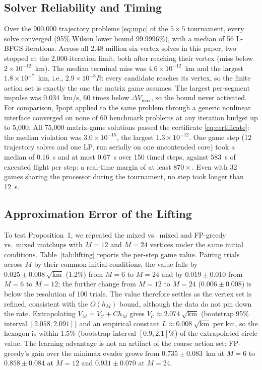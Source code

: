 \documentclass[letterpaper, 10 pt, conference]{ieeeconf}  %
\begin{document}
\subsection{Solver Reliability and Timing}

Over the 900,000 trajectory problems \eqref{eq:mpc} of the $5 \times 5$ tournament, every solve converged (95\% Wilson lower bound 99.9996\%), with a median of 56 L-BFGS iterations. Across all 2.48 million six-vertex solves in this paper, two stopped at the 2,000-iteration limit, both after reaching their vertex (miss below $2 \times 10^{-12}$~km). The median terminal miss was $4.6 \times 10^{-12}$~km and the largest $1.8 \times 10^{-7}$~km, i.e., $2.9 \times 10^{-8} R$: every candidate reaches its vertex, so the finite action set is exactly the one the matrix game assumes. The largest per-segment impulse was 0.034~km/s, 60 times below $\Delta V_{\max}$, so the bound never activated. For comparison, Ipopt applied to the same problem through a generic nonlinear interface converged on none of 60 benchmark problems at any iteration budget up to 5,000. All 75,000 matrix-game solutions passed the certificate \eqref{eq:certificate}: the median violation was $3.0 \times 10^{-15}$, the largest $1.3 \times 10^{-12}$. One game step (12 trajectory solves and one LP, run serially on one uncontended core) took a median of 0.16~s and at most 0.67~s over 150 timed steps, against 583~s of executed flight per step: a real-time margin of at least $870\times$. Even with 32 games sharing the processor during the tournament, no step took longer than 12~s.

\subsection{Approximation Error of the Lifting}

To test Proposition~1, we repeated the mixed vs.\ mixed and FP-greedy vs.\ mixed matchups with $M = 12$ and $M = 24$ vertices under the same initial conditions. Table~\ref{tab:lifting} reports the per-step game value. Pairing trials across $M$ by their common initial conditions, the value falls by $0.025 \pm 0.008\ \sqrt{\mathrm{km}}$ (1.2\%) from $M = 6$ to $M = 24$ and by $0.019 \pm 0.010$ from $M = 6$ to $M = 12$; the further change from $M = 12$ to $M = 24$ ($0.006 \pm 0.008$) is below the resolution of 100 trials. The value therefore settles as the vertex set is refined, consistent with the $O(h_M)$ bound, although the data do not pin down the rate. Extrapolating $V_M = V_{\mathcal{C}} + C h_M$ gives $V_{\mathcal{C}} \approx 2.074\ \sqrt{\mathrm{km}}$ (bootstrap 95\% interval $[2.058, 2.091]$) and an empirical constant $L \approx 0.008\ \sqrt{\mathrm{km}}$ per km, so the hexagon is within 1.5\% (bootstrap interval $[0.9, 2.1]\%$) of the extrapolated circle value. The learning advantage is not an artifact of the coarse action set: FP-greedy's gain over the minimax evader grows from $0.735 \pm 0.083$~km at $M = 6$ to $0.858 \pm 0.084$ at $M = 12$ and $0.931 \pm 0.070$ at $M = 24$.
\end{document}
